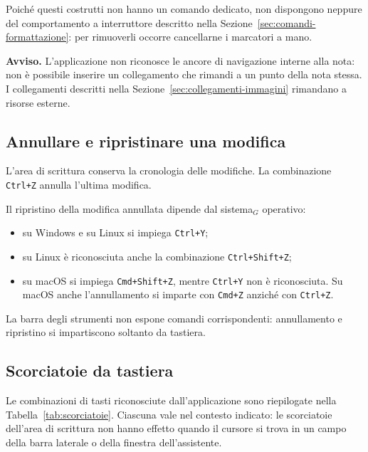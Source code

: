 \documentclass[a4paper, 10pt]{article}
\begin{document}
Poiché questi costrutti non hanno un comando dedicato, non dispongono neppure del comportamento a interruttore descritto nella Sezione~\ref{sec:comandi-formattazione}: per rimuoverli occorre cancellarne i marcatori a mano.

\vspace{0.5em}

\noindent
\textbf{Avviso.} L'applicazione non riconosce le ancore di navigazione interne alla nota: non è possibile inserire un collegamento che rimandi a un punto della nota stessa. I collegamenti descritti nella Sezione~\ref{sec:collegamenti-immagini} rimandano a risorse esterne.

\subsection{Annullare e ripristinare una modifica}
\label{sec:annullare-ripristinare}
L'area di scrittura conserva la cronologia delle modifiche. La combinazione \texttt{Ctrl+Z} annulla l'ultima modifica.

Il ripristino della modifica annullata dipende dal sistema$_G$ operativo:

\begin{itemize}
    \item su Windows e su Linux si impiega \texttt{Ctrl+Y};

    \item su Linux è riconosciuta anche la combinazione \texttt{Ctrl+Shift+Z};

    \item su macOS si impiega \texttt{Cmd+Shift+Z}, mentre \texttt{Ctrl+Y} non è riconosciuta. Su macOS anche l'annullamento si imparte con \texttt{Cmd+Z} anziché con \texttt{Ctrl+Z}.
\end{itemize}

La barra degli strumenti non espone comandi corrispondenti: annullamento e ripristino si impartiscono soltanto da tastiera.

\subsection{Scorciatoie da tastiera}
\label{sec:scorciatoie}
Le combinazioni di tasti riconosciute dall'applicazione sono riepilogate nella Tabella~\ref{tab:scorciatoie}. Ciascuna vale nel contesto indicato: le scorciatoie dell'area di scrittura non hanno effetto quando il cursore si trova in un campo della barra laterale o della finestra dell'assistente.
\end{document}
